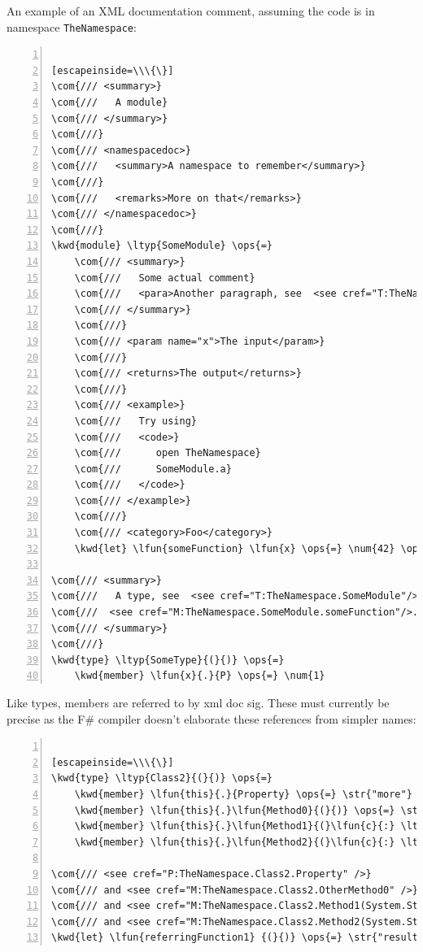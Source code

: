 \documentclass{article}
\newcommand{\com}[1]{\textcolor{officegreen}{#1}}
\newcommand{\kwd}[1]{\textcolor{navy}{#1}}
\newcommand{\num}[1]{\textcolor{officegreen}{#1}}
\newcommand{\ops}[1]{\textcolor{purple}{#1}}
\newcommand{\str}[1]{\textcolor{olive}{#1}}
\begin{document}
An example of an XML documentation comment, assuming the code is in namespace \texttt{TheNamespace}:
\begin{lstlisting}[numbers=left]

[escapeinside=\\\{\}]
\com{/// <summary>}
\com{///   A module}
\com{/// </summary>}
\com{///}
\com{/// <namespacedoc>}
\com{///   <summary>A namespace to remember</summary>}
\com{///}
\com{///   <remarks>More on that</remarks>}
\com{/// </namespacedoc>}
\com{///}
\kwd{module} \ltyp{SomeModule} \ops{=}
    \com{/// <summary>}
    \com{///   Some actual comment}
    \com{///   <para>Another paragraph, see  <see cref="T:TheNamespace.SomeType"/>. </para>}
    \com{/// </summary>}
    \com{///}
    \com{/// <param name="x">The input</param>}
    \com{///}
    \com{/// <returns>The output</returns>}
    \com{///}
    \com{/// <example>}
    \com{///   Try using}
    \com{///   <code>}
    \com{///      open TheNamespace}
    \com{///      SomeModule.a}
    \com{///   </code>}
    \com{/// </example>}
    \com{///}
    \com{/// <category>Foo</category>}
    \kwd{let} \lfun{someFunction} \lfun{x} \ops{=} \num{42} \ops{+} \lfun{x}

\com{/// <summary>}
\com{///   A type, see  <see cref="T:TheNamespace.SomeModule"/> and}
\com{///  <see cref="M:TheNamespace.SomeModule.someFunction"/>.}
\com{/// </summary>}
\com{///}
\kwd{type} \ltyp{SomeType}{(}{)} \ops{=}
    \kwd{member} \lfun{x}{.}{P} \ops{=} \num{1}

\end{lstlisting}



Like types, members are referred to by xml doc sig.  These must currently be precise as the F\#
compiler doesn't elaborate these references from simpler names:
\begin{lstlisting}[numbers=left]

[escapeinside=\\\{\}]
\kwd{type} \ltyp{Class2}{(}{)} \ops{=}
    \kwd{member} \lfun{this}{.}{Property} \ops{=} \str{"more"}
    \kwd{member} \lfun{this}{.}\lfun{Method0}{(}{)} \ops{=} \str{"more"}
    \kwd{member} \lfun{this}{.}\lfun{Method1}{(}\lfun{c}{:} \ltyp{string}{)} \ops{=} \str{"more"}
    \kwd{member} \lfun{this}{.}\lfun{Method2}{(}\lfun{c}{:} \ltyp{string}{,} \lfun{o}{:} \ltyp{obj}{)} \ops{=} \str{"more"}

\com{/// <see cref="P:TheNamespace.Class2.Property" />}
\com{/// and <see cref="M:TheNamespace.Class2.OtherMethod0" />}
\com{/// and <see cref="M:TheNamespace.Class2.Method1(System.String)" />}
\com{/// and <see cref="M:TheNamespace.Class2.Method2(System.String,System.Object)" />}
\kwd{let} \lfun{referringFunction1} {(}{)} \ops{=} \str{"result"}

\end{lstlisting}
\end{document}
